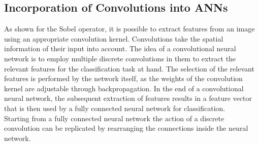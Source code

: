 \subsection{Incorporation of Convolutions into ANNs}
\label{sec:CNN}

As shown for the Sobel operator, it is possible to extract features from an image using an appropriate convolution kernel. Convolutions take the spatial information of their input into account. The idea of a convolutional neural network is to employ multiple discrete convolutions in them to extract the relevant features for the classification task at hand. The selection of the relevant features is performed by the network itself, as the weights of the convolution kernel are adjustable through backpropagation. In the end of a convolutional neural network, the subsequent extraction of features results in a feature vector that is then used by a fully connected neural network for classification.\\

Starting from a fully connected neural network the action of a discrete convolution can be replicated by rearranging the connections inside the neural network. \\ %



